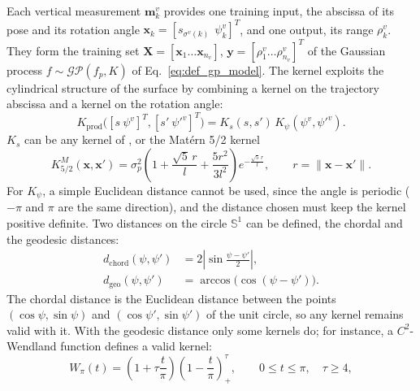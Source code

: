 Each vertical measurement $\mathbf{m}^v_k$ provides one training input, the abscissa of its pose and
its rotation angle $\mathbf{x}_k = [s_{\sigma^v(k)}\ \ \psi^v_k]^T$, and one output, its range
$\rho^v_k$. They form the training set $\mathbf{X} = [\mathbf{x}_1 \dots \mathbf{x}_{n_v}]$,
$\mathbf{y} = [\rho^v_1 \dots \rho^v_{n_v}]^T$ of the Gaussian process
$f \sim \mathcal{GP}(f_p, K)$ of Eq.~\eqref{eq:def_gp_model}. The kernel exploits the cylindrical
structure of the surface by combining a kernel on the trajectory abscissa and a kernel on the
rotation angle:
\begin{equation}                         %
  K_{\mathrm{prod}}\big([s\ \psi^v]^T, [s'\ \psi'^v]^T\big) = K_s(s, s')\, K_\psi(\psi^v, \psi'^v).
  \label{eq:msis_kernel}
\end{equation}
$K_s$ can be any kernel of , or the Mat\'ern 5/2 kernel
\citep{rasmussen2006gaussian}
\begin{equation}                         %
  K^M_{5/2}(\mathbf{x}, \mathbf{x}') = \sigma_p^2 \left(1 + \frac{\sqrt{5}\,r}{l} + \frac{5r^2}{3l^2}\right)
  e^{-\frac{\sqrt{5}\,r}{l}}, \qquad r = \lVert \mathbf{x} - \mathbf{x}' \rVert.
  \label{eq:msis_matern52}
\end{equation}
For $K_\psi$, a simple Euclidean distance cannot be used, since the angle is periodic ($-\pi$ and
$\pi$ are the same direction), and the distance chosen must keep the kernel positive definite. Two
distances on the circle $\mathbb{S}^1$ can be defined, the chordal and the geodesic distances:
\begin{align}                            %
  d_{\mathrm{chord}}(\psi, \psi') &= 2\left|\sin\frac{\psi - \psi'}{2}\right|,  \label{eq:msis_chordal}\\
  d_{\mathrm{geo}}(\psi, \psi')   &= \arccos\big(\cos(\psi - \psi')\big).        \label{eq:msis_geodesic}
\end{align}
The chordal distance is the Euclidean distance between the points $(\cos\psi, \sin\psi)$ and
$(\cos\psi', \sin\psi')$ of the unit circle, so any kernel remains valid with it. With the geodesic
distance only some kernels do; for instance, a $C^2$-Wendland function defines a valid kernel:
\begin{equation}                         %
  W_\pi(t) = \left(1 + \tau\frac{t}{\pi}\right)\left(1 - \frac{t}{\pi}\right)_+^{\tau},
  \qquad 0 \leq t \leq \pi, \quad \tau \geq 4,
  \label{eq:msis_wendland}
\end{equation}
